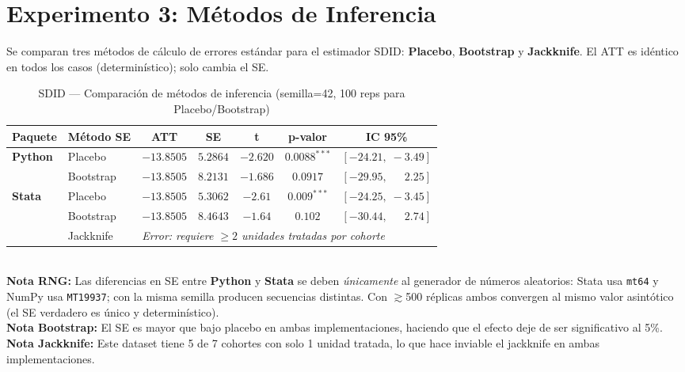 \documentclass[11pt, a4paper]{article}
\newcommand{\py}{\textcolor{pyblue}{\textbf{Python}}}
\newcommand{\st}{\textcolor{stgreen}{\textbf{Stata}}}
\begin{document}
\newpage
\section{Experimento 3: Métodos de Inferencia}

Se comparan tres métodos de cálculo de errores estándar para el estimador SDID: \textbf{Placebo}, \textbf{Bootstrap} y \textbf{Jackknife}. El ATT es idéntico en todos los casos (determinístico); solo cambia el SE.

\begin{table}[H]
\centering
\caption{SDID --- Comparación de métodos de inferencia (semilla=42, 100 reps para Placebo/Bootstrap)}
\begin{tabular}{llccccc}
\toprule
\textbf{Paquete} & \textbf{Método SE} & \textbf{ATT} & \textbf{SE} & \textbf{t} & \textbf{p-valor} & \textbf{IC 95\%} \\
\midrule
\multirow{2}{*}{\py{}}
  & Placebo    & $-13.8505$ & $5.2864$ & $-2.620$ & $0.0088^{***}$ & $[-24.21,\;-3.49]$ \\
  & Bootstrap  & $-13.8505$ & $8.2131$ & $-1.686$ & $0.0917$       & $[-29.95,\;\phantom{-}2.25]$ \\
\midrule
\multirow{3}{*}{\st{}}
  & Placebo    & $-13.8505$ & $5.3062$ & $-2.61$ & $0.009^{***}$ & $[-24.25,\;-3.45]$ \\
  & Bootstrap  & $-13.8505$ & $8.4643$ & $-1.64$ & $0.102$       & $[-30.44,\;\phantom{-}2.74]$ \\
  & Jackknife  & \multicolumn{5}{l}{\textit{Error: requiere $\geq 2$ unidades tratadas por cohorte}} \\
\bottomrule
\end{tabular}\\[0.4em]
{\small \textbf{Nota RNG:} Las diferencias en SE entre \py{} y \st{} se deben \textit{únicamente} al generador de números aleatorios: Stata usa \texttt{mt64} y NumPy usa \texttt{MT19937}; con la misma semilla producen secuencias distintas. Con $\gtrsim$500 réplicas ambos convergen al mismo valor asintótico (el SE verdadero es único y determinístico).\\
\textbf{Nota Bootstrap:} El SE es mayor que bajo placebo en ambas implementaciones, haciendo que el efecto deje de ser significativo al 5\%.\\
\textbf{Nota Jackknife:} Este dataset tiene 5 de 7 cohortes con solo 1 unidad tratada, lo que hace inviable el jackknife en ambas implementaciones.}
\end{table}
\end{document}
